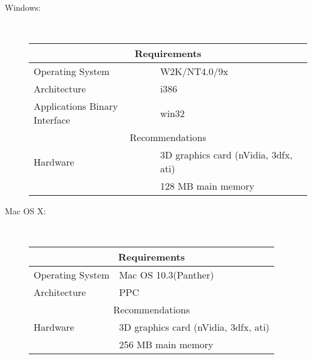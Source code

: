 \begin{description}
    \item [Windows: ] \mbox{}\\
          \begin{center}
          \begin{tabular}{|l|l|} \hline
            \multicolumn{2}{|c|}{Requirements} \\ \hline
              Operating System & W2K/NT4.0/9x\\
              Architecture & i386\\
              Applications Binary Interface  &  win32 \\
              \hline
            \multicolumn{2}{|c|}{Recommendations} \\ \hline
            Hardware & 3D graphics card (nVidia, 3dfx, ati)\\
            & 128 MB main memory \\ \hline
          \end{tabular}
          \end{center}

    \item [Mac OS X: ] \mbox{}\\
          \begin{center}
          \begin{tabular}{|l|l|} \hline
            \multicolumn{2}{|c|}{Requirements} \\ \hline
              Operating System & Mac OS 10.3(Panther)\\
              Architecture & PPC\\
              \hline
            \multicolumn{2}{|c|}{Recommendations} \\ \hline
            Hardware & 3D graphics card (nVidia, 3dfx, ati)\\
            & 256 MB main memory \\ \hline
          \end{tabular}
          \end{center}
          

\end{description}
